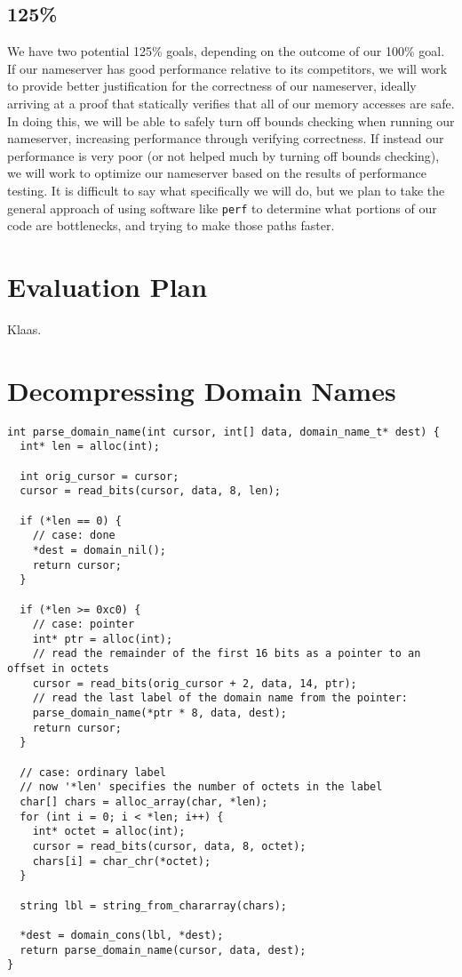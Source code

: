 \documentclass{article}
\begin{document}
\subsection{125\%}

We have two potential 125\% goals, depending on the outcome of our 100\% goal. If our nameserver has good performance relative to its competitors, we will work to provide better justification for the correctness of our nameserver, ideally arriving at a proof that statically verifies that all of our memory accesses are safe. In doing this, we will be able to safely turn off bounds checking when running our nameserver, increasing performance through verifying correctness. If instead our performance is very poor (or not helped much by turning off bounds checking), we will work to optimize our nameserver based on the results of performance testing. It is difficult to say what specifically we will do, but we plan to take the general approach of using software like \texttt{perf} to determine what portions of our code are bottlenecks, and trying to make those paths faster.

\section{Evaluation Plan}

Klaas.


\nocite{rfc:1034, rfc:1035}



\clearpage
\appendix
\section{Decompressing Domain Names}\label{appendix:decompression}

\begin{lstlisting}
int parse_domain_name(int cursor, int[] data, domain_name_t* dest) {
  int* len = alloc(int);

  int orig_cursor = cursor;
  cursor = read_bits(cursor, data, 8, len);

  if (*len == 0) {
    // case: done
    *dest = domain_nil();
    return cursor;
  }

  if (*len >= 0xc0) {
    // case: pointer
    int* ptr = alloc(int);
    // read the remainder of the first 16 bits as a pointer to an offset in octets
    cursor = read_bits(orig_cursor + 2, data, 14, ptr);
    // read the last label of the domain name from the pointer:
    parse_domain_name(*ptr * 8, data, dest);
    return cursor;
  }

  // case: ordinary label
  // now '*len' specifies the number of octets in the label
  char[] chars = alloc_array(char, *len);
  for (int i = 0; i < *len; i++) {
    int* octet = alloc(int);
    cursor = read_bits(cursor, data, 8, octet);
    chars[i] = char_chr(*octet);
  }

  string lbl = string_from_chararray(chars);

  *dest = domain_cons(lbl, *dest);
  return parse_domain_name(cursor, data, dest);
}
\end{lstlisting}
\end{document}

